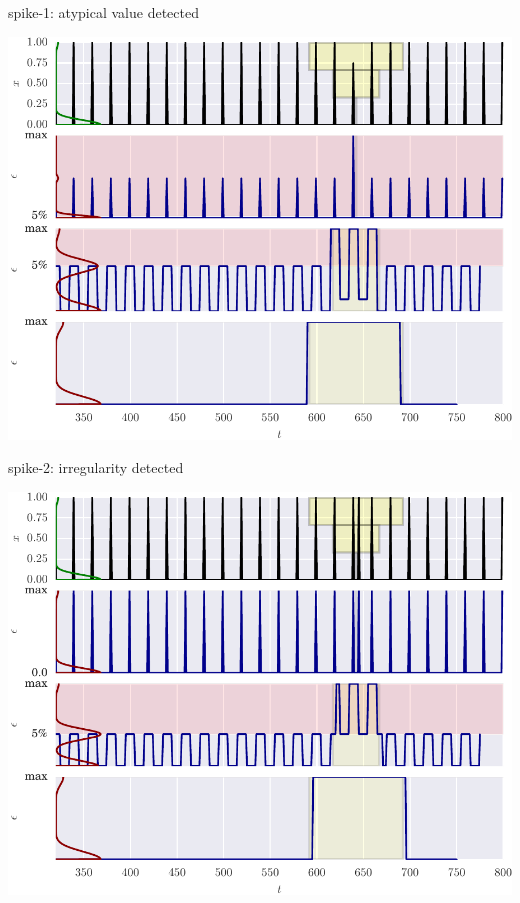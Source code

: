 \documentclass{beamer}
\begin{document}
    \begin{frame}{spike-1: atypical value detected}

      \includegraphics[width=\textwidth]{figs/er_spikelv.pdf}

    \end{frame}


    \begin{frame}{spike-2: irregularity detected}

      \includegraphics[width=\textwidth]{figs/er_spikereg.pdf}

    \end{frame}
\end{document}
